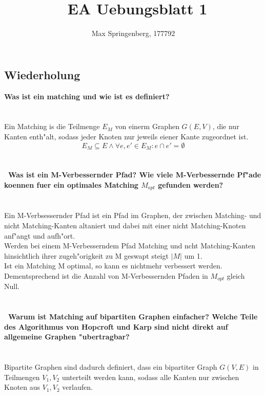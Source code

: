 \documentclass{article}
\author{Max Springenberg, 177792}
\title{\
    EA Uebungsblatt 1
    }
\date{}
\newcommand{\gap}{\null\ \\ \ \\}
\newcommand{\task}[1]{\textbf{#1} \\ \gap}
\begin{document}
\maketitle
\newpage
\subsection{Wiederholung}
\task{Was ist ein matching und wie ist es definiert?}
Ein Matching is die Teilmenge $E_M$ von einerm Graphen $G(E,V)$, die nur Kanten
    enth"alt, sodass jeder Knoten nur jeweils eiener Kante zugeordnet ist.\[
        E_M \subseteq E \land \forall e, e' \in E_M : e \cap e' = \emptyset
    \]
\gap
\task{\
    Was ist ein M-Verbessernder Pfad? Wie viele M-Verbessernde Pf"ade koennen
        fuer ein optimales Matching $M_{opt}$ gefunden werden?
    }
Ein M-Verbsessernder Pfad ist ein Pfad im Graphen, der zwischen Matching- und 
    nicht Matching-Kanten altaniert und dabei mit einer nicht Matching-Knoten
    anf"angt und aufh"ort.\\
Werden bei einem M-Verbesserndem Pfad Matching und ncht Matching-Kanten
    hinsichtlich ihrer zugeh"origkeit zu M geswapt steigt $|M|$ um 1.\\
Ist ein Matching M optimal, so kann es nichtmehr verbessert werden.
    Dementsprechend ist die Anzahl von M-Verbessernden Pfaden in $M_{opt}$
    gleich Null.\\
\gap
\task{\
    Warum ist Matching auf bipartiten Graphen einfacher? Welche Teile des
        Algorithmus von Hopcroft und Karp sind nicht direkt auf allgemeine
        Graphen "ubertragbar?
    }
Bipartite Graphen sind dadurch definiert, dass ein bipartiter Graph $G(V,E)$
    in Teilmengen $V_1, V_2$ unterteilt werden kann, sodass alle Kanten nur
    zwischen Knoten aus $V_1, V_2$ verlaufen.\\
\end{document}

